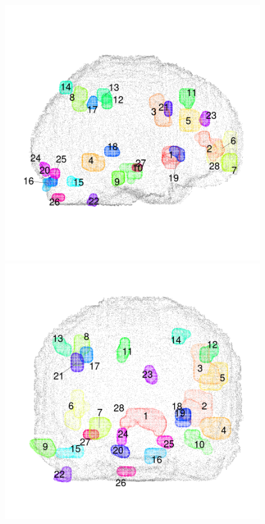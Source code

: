 \documentclass[12pt]{article}
\begin{document}
\begin{figure}[h]
\centering
\includegraphics[scale = 0.1]{../a7plots/all_rois_view1.png}
\includegraphics[scale = 0.1]{../a7plots/all_rois_view2.png}

\end{figure}
\end{document}
